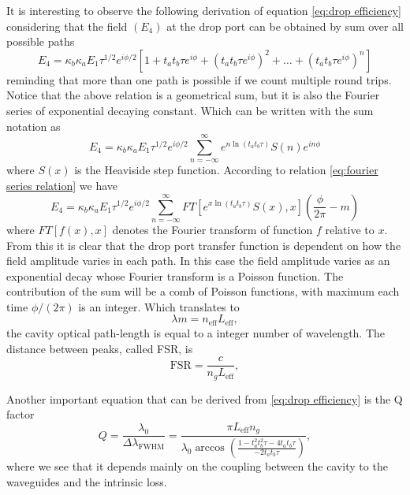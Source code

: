 \documentclass[12pt,twoside,english]{book}
\renewcommand{\~}{\perispomeni}%
\numberwithin{equation}{section}
\numberwithin{figure}{section}
\begin{document}
It is interesting to observe the following derivation of equation \ref{eq:drop efficiency} considering that the field $(E_4)$ at the drop port can be obtained by sum over all possible paths
\begin{equation}
E_{4}=\kappa_{b}\kappa_{a}E_{1}\tau^{1/2}e^{i\phi/2}\left[1+t_{a}t_{b}\tau e^{i\phi}+\left(t_{a}t_{b}\tau e^{i\phi}\right)^{2}+\dots+\left(t_{a}t_{b}\tau e^{i\phi}\right)^{n}\right]
\end{equation}
reminding that more than one path is possible if we count multiple round trips. Notice that the above relation is a geometrical sum, but it is also the Fourier series of  exponential decaying constant. Which can be written with the sum notation as
\begin{equation}
E_{4}=\kappa_{b}\kappa_{a}E_{1}\tau^{1/2}e^{i\phi/2}\sum_{n=-\infty}^{\infty}e^{n\ln\left(t_{a}t_{b}\tau\right)}S\left(n\right)e^{in\phi}
\end{equation}
where $S\left(x\right)$ is the Heaviside step function. According to relation \ref{eq:fourier series relation} we have
\begin{equation}
E_{4}=\kappa_{b}\kappa_{a}E_{1}\tau^{1/2}e^{i\phi/2}\sum_{n=-\infty}^{\infty}FT\left[e^{x\ln\left(t_{a}t_{b}\tau\right)}S\left(x\right),x\right]\left(\frac{\phi}{2\pi}-m\right)
\end{equation}
where $FT\left[f\left(x\right),x\right]$ denotes the Fourier transform of function $f$ relative to $x$. From this it is clear that the drop port transfer function is dependent on how the field amplitude varies in each path. In this case the field amplitude varies as an exponential decay whose Fourier transform is a Poisson function. The contribution of the sum will be a comb of Poisson functions, with maximum each time $\phi/\left(2\pi\right)$ is an integer. Which translates to
\begin{equation}
\lambda m = n_{\text{eff}}L_{\text{eff}},
\end{equation}
the cavity optical path-length is equal to a integer number of wavelength. The distance between peaks, called \gls{FSR}, is
\begin{equation}
\text{FSR} = \frac{c}{n_g L_{\text{eff}}},
\end{equation}
 
\begin{figure}
\centering 
\caption{\label{fig:exp decay}}
\end{figure}
Another important equation that can be derived from \ref{eq:drop efficiency} is the Q factor
\begin{equation}
Q=\frac{\lambda_{0}}{\Delta\lambda_{\text{FWHM}}}=\frac{\pi L_{\text{eff}}n_{g}}{\lambda_{0}\arccos\left(\frac{1-t_{a}^{2}t_{b}^{2}\tau-4t_{a}t_{b}\tau}{-2t_{a}t_{b}\tau}\right)},
\label{eq:Q}
\end{equation}
where we see that it depends mainly on the coupling between the cavity to the waveguides and the intrinsic loss.
\end{document}
